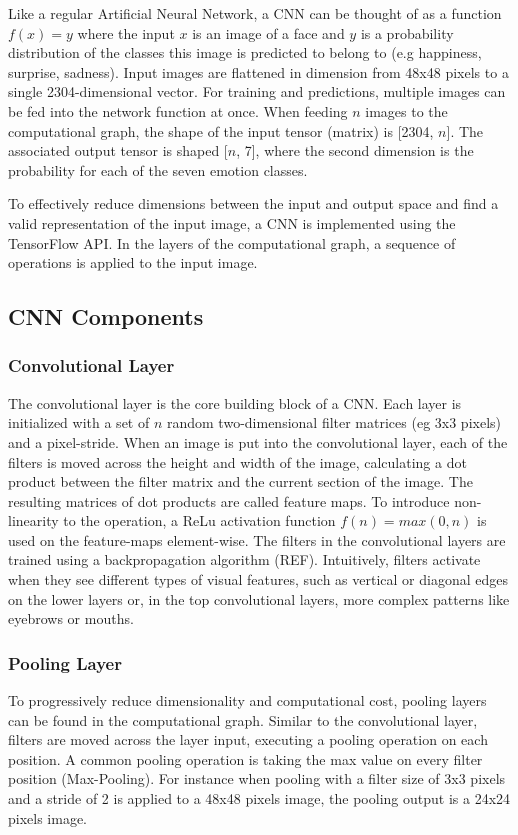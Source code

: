 \documentclass[twoside]{article}
\begin{document}
\begin{multicols}{2}
Like a regular Artificial Neural Network, a CNN can be thought of as a function $f(x) = y$ where the input $x$ is an image of a face and $y$ is a probability distribution of the classes this image is predicted to belong to (e.g happiness, surprise, sadness). Input images are flattened in dimension from 48x48 pixels to a single 2304-dimensional vector. For training and predictions, multiple images can be fed into the network function at once. When feeding $n$ images to the computational graph, the shape of the input tensor (matrix) is [2304, $n$]. The associated output tensor is shaped [$n$, 7], where the second dimension is the probability for each of the seven emotion classes.

To effectively reduce dimensions between the input and output space and find a valid representation of the input image, a CNN is implemented using the TensorFlow API. In the layers of the computational graph, a sequence of operations is applied to the input image. 

\subsection{CNN Components}

\subsubsection{Convolutional Layer}
The convolutional layer is the core building block of a CNN. Each layer is initialized with a set of $n$ random two-dimensional filter matrices (eg 3x3 pixels) and a pixel-stride. When an image is put into the convolutional layer, each of the filters is moved across the height and width of the image, calculating a dot product between the filter matrix and the current section of the image. The resulting matrices of dot products are called feature maps. To introduce non-linearity to the operation, a ReLu activation function $f(n) = max(0, n)$ is used on the feature-maps element-wise. The filters in the convolutional layers are trained using a backpropagation algorithm (REF). Intuitively, filters activate when they see different types of visual features, such as vertical or diagonal edges on the lower layers or, in the top convolutional layers, more complex patterns like eyebrows or mouths.

\subsubsection{Pooling Layer}
To progressively reduce dimensionality and computational cost, pooling layers can be found in the computational graph. Similar to the convolutional layer, filters are moved across the layer input, executing a pooling operation on each position. A common pooling operation is taking the max value on every filter position (Max-Pooling). For instance when pooling with a filter size of 3x3 pixels and a stride of 2 is applied to a 48x48 pixels image, the pooling output is a 24x24 pixels image.


\end{multicols}
\end{document}
